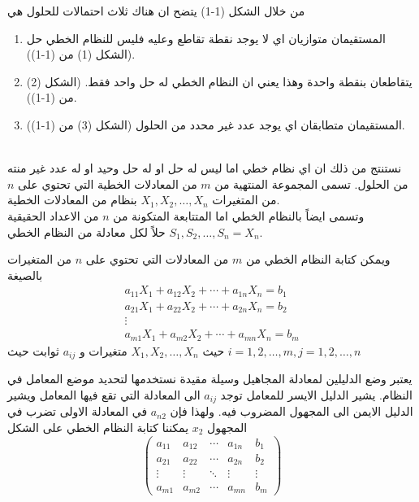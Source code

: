 	\begin{frame}
		\begin{exampleblock}{}
			من خلال الشكل (1-1) يتضح ان هناك ثلاث احتمالات للحلول هي
			\begin{enumerate}
				\item المستقيمان متوازيان اي لا يوجد نقطة تقاطع وعليه فليس للنظام الخطي حل (الشكل (1) من (1-1)).
				\item يتقاطعان بنقطة واحدة وهذا يعني ان النظام الخطي له حل واحد فقط. (الشكل (2) من (1-1)).
				\item المستقيمان متطابقان اي يوجد عدد غير محدد من الحلول (الشكل (3) من (1-1)).
			\end{enumerate}
			\noindent
			\\
			نستنتج من ذلك ان اي نظام خطي اما ليس له حل او له حل وحيد او له عدد غير منته من الحلول. تسمى المجموعة المنتهية من $m$ من المعادلات الخطية التي تحتوي على $n$ من المتغيرات 
			$X_1, X_2 , \dots, X_n$
			بنظام من المعادلات الخطية.\\ 
			وتسمى ايضاً بالنظام الخطي اما المتتابعة المتكونة من $n$ من الاعداد الحقيقية $S_1 , S_2, \dots, S_n=X_n$ حلاً لكل معادلة من النظام الخطي.
		\end{exampleblock}
	\end{frame}
	
	\begin{frame}
		\begin{exampleblock}{}
			ويمكن كتابة النظام الخطي من $m$ من المعادلات التي تحتوي على $n$ من المتغيرات بالصيغة
			\begin{equation*}
				\begin{gathered}
					a_{11}X_1 + a_{12}X_2 + \cdots + a_{1n} X_n = b_1\\
					a_{21}X_1 + a_{22}X_2 + \cdots + a_{2n} X_n = b_2\\
					\vdots\\
					a_{m1}X_1 + a_{m2}X_2 + \cdots + a_{mn} X_n = b_m
				\end{gathered}
			\end{equation*}
			حيث $X_1 , X_2, \dots,X_n$ متغيرات و $a_{ij}$ ثوابت حيث 
			$i=1,2,\dots,m, j=1,2,\dots,n$
			
			\noindent
			يعتبر وضع الدليلين لمعادلة المجاهيل وسيلة مقيدة نستخدمها لتحديد موضع المعامل في النظام. يشير الدليل الايسر للمعامل توجد $a_{ij}$ الى المعادلة التي تقع فيها المعامل ويشير الدليل الايمن الى المجهول المضروب فيه. ولهذا فإن $a_{n2}$ في المعادلة الاولى تضرب في المجهول $x_2$ يمكننا كتابة النظام الخطي على الشكل
			\[
			\left(
			\begin{array}{cccc|c}
				a_{11} & a_{12} & \cdots & a_{1n} & b_1\\
				a_{21} & a_{22} & \cdots & a_{2n} & b_2\\
				\vdots&\vdots&\ddots&\vdots &\vdots\\
				a_{m1} & a_{m2} & \cdots& a_{mn} & b_m
			\end{array}
			\right)
			\]
		\end{exampleblock}
	\end{frame}
	
